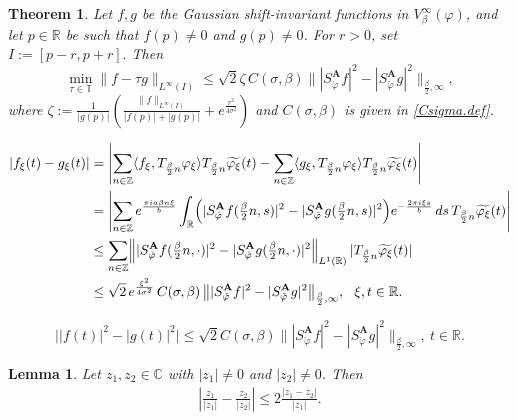 \documentclass[10pt,a4paper]{amsart}
\newtheorem{theorem}{Theorem}
\newtheorem{lemma}{Lemma}
\newcommand{\C}{\mathbb{C}}
\newcommand{\R}{\mathbb{R}}
\newcommand{\T}{\mathbb{T}}
\newcommand{\Z}{\mathbb{Z}}
\begin{document}
\begin{theorem}\label{local.stable.thm1}
Let $f,g$ be the Gaussian shift-invariant functions in $V_\beta^\infty(\varphi)$, and let $p\in\R$ be such that
$f(p)\neq 0$ and $g(p)\neq 0$. For $r>0$, set  $ I:=[p-r,p+r].$
Then
\begin{equation}\label{local.stable.eq1}
\min_{\tau \in \T}\|f-\tau g\|_{L^\infty(I)} \le
\sqrt{2}\zeta\,C(\sigma,\beta)\bigl\||S_{\check{\varphi}}^{\mathbf A}f|^2-|S_{\check{\varphi}}^{\mathbf A}g|^2\bigr\|_{\frac{\beta}{2},\infty},
\end{equation}
where $\zeta := \frac{1}{|g(p)|} \left( \frac{\|f\|_{L^\infty(I)}}{|f(p)| + |g(p)|} + e^{\frac{r^2}{4\sigma^2}} \right)$ and $C(\sigma,\beta)$ is given in \eqref{Csigma.def}. 
\end{theorem}

\begin{align}\label{eq13}
    |f_\xi(t)-g_\xi(t)|  &=
    \left|   \sum_{n\in\Z}  \langle f_\xi,T_{\frac{\beta}{2}n}\varphi_\xi\rangle
    T_{\frac{\beta}{2}n}\widetilde{\varphi_\xi}(t)   -   \sum_{n\in\Z}   \langle g_\xi,T_{\frac{\beta}{2}n}\varphi_\xi\rangle T_{\frac{\beta}{2}n}\widetilde{\varphi_\xi}(t) \right| \notag\\
    &= \left|  \sum_{n\in\Z}  e^{\frac{\pi ia\beta n\xi}{b}}  \int_{\R}
    \Bigl(   |S_{\check{\varphi}}^{\mathbf A}f(\tfrac{\beta}{2}n,s)|^2 -   |S_{\check{\varphi}}^{\mathbf A}g(\tfrac{\beta}{2}n,s)|^2\Bigr) e^{-\frac{2\pi i\xi s}{b}}\,ds\, T_{\frac{\beta}{2}n}\widetilde{\varphi_\xi}(t)    \right| \notag\\
    &\le   \sum_{n\in\Z}  \Bigl\|
    |S_{\check{\varphi}}^{\mathbf A}f(\tfrac{\beta}{2}n,\cdot)|^2  -
    |S_{\check{\varphi}}^{\mathbf A}g(\tfrac{\beta}{2}n,\cdot)|^2  \Bigr\|_{L^1(\R)}  \,
   |T_{\frac{\beta}{2}n}\widetilde{\varphi_\xi}(t)| \notag\\
    &\le \sqrt{2}\,   e^{\frac{\xi^2}{4\sigma^2}}\,  C(\sigma,\beta)\,    \bigl\|
    |S_{\check{\varphi}}^{\mathbf A}f|^2  -  |S_{\check{\varphi}}^{\mathbf A}g|^2
    \bigr\|_{\frac{\beta}{2},\infty}, \ \  \xi,t\in\R.
\end{align}

\begin{equation}\label{abs.eq1}
    \bigl||f(t)|^2-|g(t)|^2\bigr|   \le  \sqrt{2}C(\sigma,\beta)  \bigl\|
    |S_{\check{\varphi}}^{\mathbf A}f|^2   -    |S_{\check{\varphi}}^{\mathbf A}g|^2
    \bigr\|_{\frac{\beta}{2},\infty},
\  t\in\R.
\end{equation}

\begin{lemma}\label{prop1}
    Let $z_1, z_2 \in \C$ with $|z_1|\ne 0$ and $|z_2|\ne 0$. Then
    \begin{align*}
        \left| \frac{z_1}{|z_1|} - \frac{z_2}{|z_2|} \right| \le 2\frac{|z_1 - z_2|}{|z_1|}.
    \end{align*}
\end{lemma}
\end{document}
